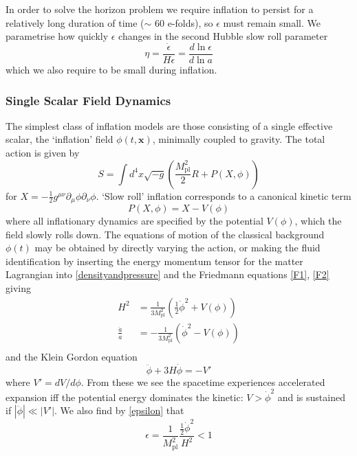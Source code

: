 \documentclass[a4paper,10pt]{article}
\renewcommand{\v}[1]{\mathbf{#1}}
\newcommand{\Mp}{M_{\text{pl}}}
\newcommand{\half}{\frac{1}{2}}
\begin{document}
In order to solve the horizon problem we require inflation to persist for a relatively long duration of time ($\sim$ 60 e-folds), so $\epsilon$ must remain small. We parametrise how quickly $\epsilon$ changes in the second Hubble slow roll parameter 
\begin{equation}
\eta = \frac{\dot{\epsilon}}{H\epsilon} = \frac{d\ln{\epsilon}}{d\ln{a}}
\end{equation}
which we also require to be small during inflation.

\subsubsection{Single Scalar Field Dynamics}

The simplest class of inflation models are those consisting of a single effective scalar, the `inflation' field $\phi(t,\v{x})$, minimally coupled to gravity. The total action is given by
\begin{equation}
S =  \int d^4x \sqrt{-g}\left(\frac{\Mp^2}{2}R+P(X,\phi)\right) 
\label{inflationaction}
\end{equation}
for $X=-\half g^{\mu\nu}\partial_\mu\phi\partial_\nu\phi$. `Slow roll' inflation corresponds to a canonical kinetic term 
\begin{equation}
P(X,\phi) = X - V(\phi)
\end{equation}
where all inflationary dynamics are specified by the potential $V(\phi)$, which the field slowly rolls down. The equations of motion of the classical background $\phi(t)$ may be obtained by directly varying the action, or making the fluid identification by inserting the energy momentum tensor for the matter Lagrangian into \ref{densityandpressure} and the Friedmann equations \ref{F1}, \ref{F2} giving 
\begin{align*}
\tag{F1'}
\label{F1'}
H^2 &= \frac{1}{3\Mp^2}\left(\half\dot{\phi}^2+V(\phi)\right)\\
\tag{F2'}
\label{F2'}
\frac{\ddot{a}}{a} &= -\frac{1}{3\Mp^2}\left(\dot{\phi}^2-V(\phi)\right)\\
\end{align*}
and the Klein Gordon equation
\begin{equation}
\tag{KG}
\label{KG}
\ddot{\phi}+3H\dot{\phi}=-V'
\end{equation}
where $V'=dV/d\phi$. From these we see the spacetime experiences accelerated expansion iff the potential energy dominates the kinetic: $V > \dot{\phi}^2$ and is sustained if $|\ddot{\phi}| \ll |V'|$. We also find by \ref{epsilon} that 
\begin{equation}
\epsilon = \frac{1}{\Mp^2}\frac{\half\dot{\phi}^2}{H^2} < 1
\end{equation}
\end{document}
